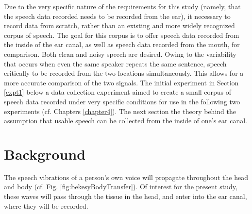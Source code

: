 Due to the very specific nature of the requirements for this study (namely, that the speech data recorded needs to be recorded from the ear), it \DIFdelbegin {}\DIFdelend \DIFaddbegin {}\DIFaddend necessary to record data from scratch, rather than \DIFdelbegin {}\DIFdelend \DIFaddbegin {}\DIFaddend an existing and more widely recognized corpus of speech.  The goal for this \DIFaddbegin {}\DIFaddend corpus is to offer speech data recorded from the inside of the ear canal, as well as speech data recorded from the mouth, for comparison.  Both clean and noisy speech are desired.
Owing to the variability that occurs when even the same speaker repeats the same sentence, speech critically \DIFdelbegin {}\DIFdelend \DIFaddbegin {}\DIFaddend to be recorded from the two locations simultaneously.  This allows for a more accurate comparison of the two signals.
The initial experiment in Section \ref{expt1} below \DIFdelbegin {}\DIFdelend \DIFaddbegin {}\DIFaddend a data collection experiment aimed to create a small corpus of speech data recorded under very specific conditions for use in the following two experiments (cf. Chapters \DIFdelbegin {}\DIFdelend \DIFaddbegin {}\DIFaddend \ref{chapter4}).  The next section \DIFdelbegin {}\DIFdelend \DIFaddbegin {}\DIFaddend the theory behind the assumption that usable speech can be collected from the inside of one's ear canal.

\section{Background}

The speech vibrations of a person's own voice will propagate throughout the head and body (cf. Fig. \ref{fig:bekesyBodyTransfer}).  Of interest for the present study, these waves will pass through the tissue in the head, and enter into the ear canal, where they will be recorded.

\DIFdelbegin %

